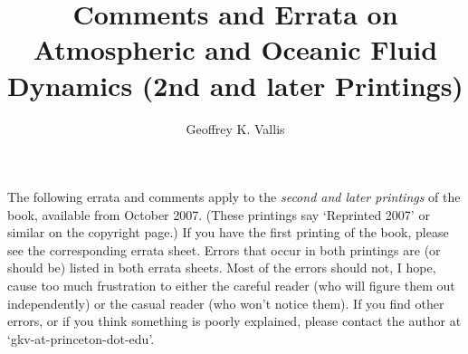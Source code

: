 \documentclass[10pt]{article}
\begin{document}
\title{\sffamily Comments and Errata on Atmospheric and Oceanic Fluid Dynamics (2nd and later Printings)}
\author{\sffamily Geoffrey K. Vallis}
\maketitle
%

\noindent 


The following errata and comments apply to the \emph{second and later printings} of the book, available from October 2007. (These printings say `Reprinted 2007' or similar on the copyright page.) If you have the first printing of the book, please see the corresponding errata sheet. Errors that occur in both printings are (or should be) listed in both errata sheets. Most of the errors should not, I hope, cause too much frustration to either the careful reader (who will figure them out independently) or the casual reader (who won't notice them). If you find other errors, or if you think something is poorly explained, please contact the author at `gkv-at-princeton-dot-edu'. 
\end{document}
